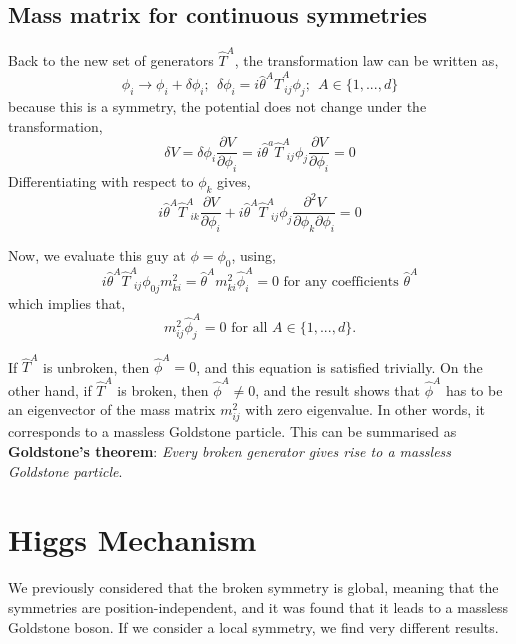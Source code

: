 \subsection{Mass matrix for continuous symmetries}
Back to the new set of generators $\hat{T}^A$, the transformation law can be written as, 
\begin{equation}
    \phi_i\rightarrow \phi_i + \delta\phi_i; \ \ \delta\phi_i = i\hat{\theta}^A\hat{T}^A_{\ ij}\phi_j; \ \ A\in\{1,..., d\}
\end{equation}
because this is a symmetry, the potential does not change under the transformation, 
\begin{equation}
    \delta V = \delta\phi_i\frac{\partial V}{\partial\phi_i} = i\hat{\theta}^a\hat{T}^A_{\ \ ij}\phi_j\frac{\partial V}{\partial \phi_i} = 0 
\end{equation}
Differentiating with respect to $\phi_k$ gives, 
\begin{equation}
    i\hat{\theta}^A\hat{T}^A_{\ \ ik}\frac{\partial V}{\partial\phi_i} + i\hat{\theta}^A\hat{T}^A_{\ \ ij}\phi_j\frac{\partial^2 V}{\partial \phi_k\partial\phi_i} = 0 
\end{equation}

Now, we evaluate this guy at $\phi = \phi_0$, using, 
\begin{equation}
    i\hat{\theta}^A\hat{T}^A_{\ \ ij}\phi_{0j}m^2_{ki} = \hat{\theta}^A m^2_{ki}\hat{\phi}^A_{i} = 0  \text{ for any coefficients } \hat{\theta}^A
\end{equation}
which implies that, 
\begin{equation}
    m^2_{ij}\hat{\phi}^A_j = 0 \text{ for all } A\in \{1,...,d\}.
\end{equation}

If $\hat{T}^A$ is unbroken, then $\hat{\phi}^A = 0$, and this equation is satisfied trivially. On the other hand, if $\hat{T}^A$ is broken, then $\hat{\phi}^A\neq 0$, and the result shows that $\hat{\phi}^A$ has to be an eigenvector of the mass matrix $m^2_{ij}$ with zero eigenvalue. In other words, it corresponds to a massless Goldstone particle. This can be summarised as \textbf{Goldstone's theorem}: \textit{Every broken generator gives rise to a massless Goldstone particle}. 

\section{Higgs Mechanism}
We previously considered that the broken symmetry is global, meaning that the symmetries are position-independent, and it was found that it leads to a massless Goldstone boson. If we consider a local symmetry, we find very different results. 
